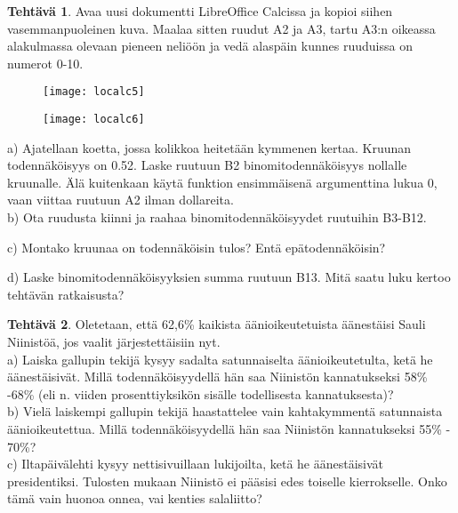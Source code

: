 \documentclass[12pt,leqno,a4paper,oneside]{amsart}
\theoremstyle{definition}
\newtheorem{exercise}{Tehtävä}
\theoremstyle{remark}
\numberwithin{equation}{section}
\begin{document}
\begin{exercise}
\label{lolaatikko}
 Avaa uusi dokumentti LibreOffice Calcissa ja kopioi siihen vasemmanpuoleinen kuva. Maalaa sitten ruudut A2 ja A3, tartu A3:n oikeassa alakulmassa
 olevaan pieneen neliöön ja vedä alaspäin kunnes ruuduissa on numerot 0-10.
 \begin{figure}[H]
 \begin{center} 
 \begin{minipage}{.45\textwidth}
 \texttt{[image: localc5]}
 \end{minipage}
 \begin{minipage}{.45\textwidth}
 \texttt{[image: localc6]}
 \end{minipage}
 \end{center}
 \end{figure}
 
 a) Ajatellaan koetta, jossa kolikkoa heitetään kymmenen kertaa. Kruunan todennäköisyys on 0.52. Laske ruutuun B2 binomitodennäköisyys nollalle
    kruunalle. Älä kuitenkaan käytä funktion ensimmäisenä argumenttina lukua 0, vaan viittaa ruutuun A2 ilman dollareita.\\
    
 b) Ota ruudusta kiinni ja raahaa binomitodennäköisyydet ruutuihin B3-B12.
 
 c) Montako kruunaa on todennäköisin tulos? Entä epätodennäköisin?
 
 d) Laske binomitodennäköisyyksien summa ruutuun B13. Mitä saatu luku kertoo tehtävän ratkaisusta?
\end{exercise}


\begin{exercise}
\label{kannatustehtava}
 Oletetaan, että 62,6\% kaikista äänioikeutetuista äänestäisi Sauli Niinistöä, jos vaalit järjestettäisiin nyt.\\
 a) Laiska gallupin tekijä kysyy sadalta satunnaiselta äänioikeutetulta, ketä he äänestäisivät. Millä todennäköisyydellä hän saa Niinistön kannatukseksi
 58\% -68\% (eli n. viiden prosenttiyksikön sisälle todellisesta kannatuksesta)?\\
 b) Vielä laiskempi gallupin tekijä haastattelee vain kahtakymmentä sa\-tun\-nais\-ta äänioikeutettua. Millä todennäköisyydellä hän saa Niinistön kannatukseksi
 55\% - 70\%? \\
 c) Iltapäivälehti kysyy nettisivuillaan lukijoilta, ketä he äänestäisivät presidentiksi. Tulosten mukaan Niinistö ei pääsisi edes toiselle kierrokselle.
 Onko tämä vain huonoa onnea, vai kenties salaliitto?
\end{exercise}
\end{document}
